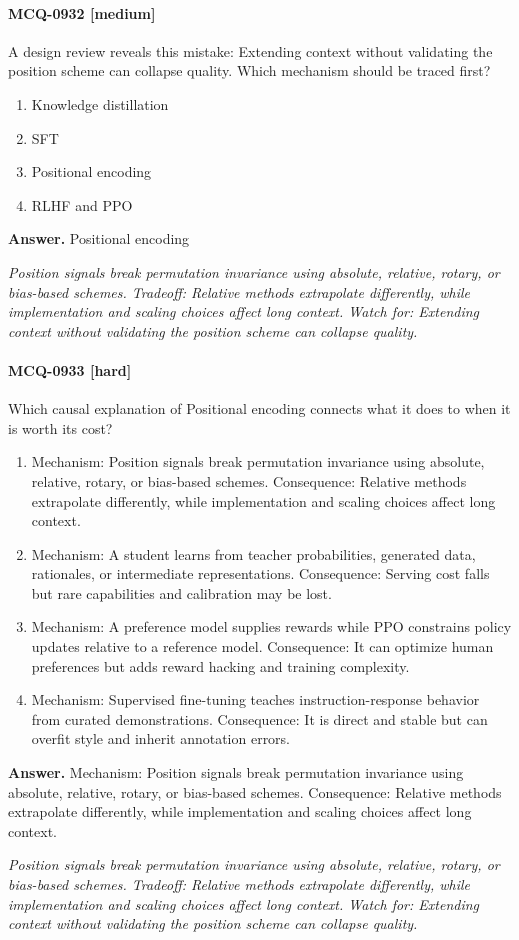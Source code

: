 \paragraph{MCQ-0932 [medium]} A design review reveals this mistake: Extending context without validating the position scheme can collapse quality. Which mechanism should be traced first?
\begin{enumerate}[label=\Alph*.]
\item Knowledge distillation
\item SFT
\item Positional encoding
\item RLHF and PPO
\end{enumerate}
\noindent\textbf{Answer.} Positional encoding
\par\textit{Position signals break permutation invariance using absolute, relative, rotary, or bias-based schemes. Tradeoff: Relative methods extrapolate differently, while implementation and scaling choices affect long context. Watch for: Extending context without validating the position scheme can collapse quality.}
\paragraph{MCQ-0933 [hard]} Which causal explanation of Positional encoding connects what it does to when it is worth its cost?
\begin{enumerate}[label=\Alph*.]
\item Mechanism: Position signals break permutation invariance using absolute, relative, rotary, or bias-based schemes. Consequence: Relative methods extrapolate differently, while implementation and scaling choices affect long context.
\item Mechanism: A student learns from teacher probabilities, generated data, rationales, or intermediate representations. Consequence: Serving cost falls but rare capabilities and calibration may be lost.
\item Mechanism: A preference model supplies rewards while PPO constrains policy updates relative to a reference model. Consequence: It can optimize human preferences but adds reward hacking and training complexity.
\item Mechanism: Supervised fine-tuning teaches instruction-response behavior from curated demonstrations. Consequence: It is direct and stable but can overfit style and inherit annotation errors.
\end{enumerate}
\noindent\textbf{Answer.} Mechanism: Position signals break permutation invariance using absolute, relative, rotary, or bias-based schemes. Consequence: Relative methods extrapolate differently, while implementation and scaling choices affect long context.
\par\textit{Position signals break permutation invariance using absolute, relative, rotary, or bias-based schemes. Tradeoff: Relative methods extrapolate differently, while implementation and scaling choices affect long context. Watch for: Extending context without validating the position scheme can collapse quality.}
